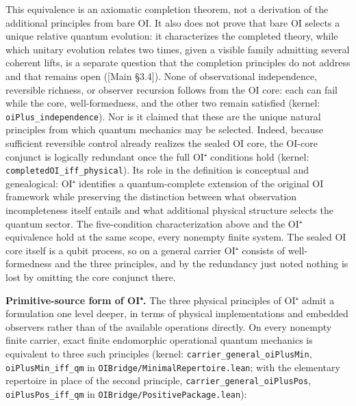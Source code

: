 \documentclass[
]{article}
\begin{document}
This equivalence is an axiomatic completion theorem, not a derivation of
the additional principles from bare OI. It also does not prove that bare
OI selects a unique relative quantum evolution: it characterizes the
completed theory, while which unitary evolution relates two times, given
a visible family admitting several coherent lifts, is a separate
question that the completion principles do not address and that remains
open ({[}Main §3.4{]}). None of observational independence, reversible
richness, or observer recursion follows from the OI core: each can fail
while the core, well-formedness, and the other two remain satisfied
(kernel: \texttt{oiPlus\_independence}). Nor is it claimed that these
are the unique natural principles from which quantum mechanics may be
selected. Indeed, because sufficient reversible control already realizes
the sealed OI core, the OI-core conjunct is logically redundant once the
full OI⁺ conditions hold (kernel: \texttt{completedOI\_iff\_physical}).
Its role in the definition is conceptual and genealogical: OI⁺
identifies a quantum-complete extension of the original OI framework
while preserving the distinction between what observation incompleteness
itself entails and what additional physical structure selects the
quantum sector. The five-condition characterization above and the OI⁺
equivalence hold at the same scope, every nonempty finite system. The
sealed OI core itself is a qubit process, so on a general carrier OI⁺
consists of well-formedness and the three principles, and by the
redundancy just noted nothing is lost by omitting the core conjunct
there.

\textbf{Primitive-source form of OI⁺.} The three physical principles of
OI⁺ admit a formulation one level deeper, in terms of physical
implementations and embedded observers rather than of the available
operations directly. On every nonempty finite carrier, exact finite
endomorphic operational quantum mechanics is equivalent to three such
principles (kernel: \texttt{carrier\_general\_oiPlusMin},
\texttt{oiPlusMin\_iff\_qm} in \texttt{OIBridge/MinimalRepertoire.lean};
with the elementary repertoire in place of the second principle,
\texttt{carrier\_general\_oiPlusPos}, \texttt{oiPlusPos\_iff\_qm} in
\texttt{OIBridge/PositivePackage.lean}):
\end{document}
